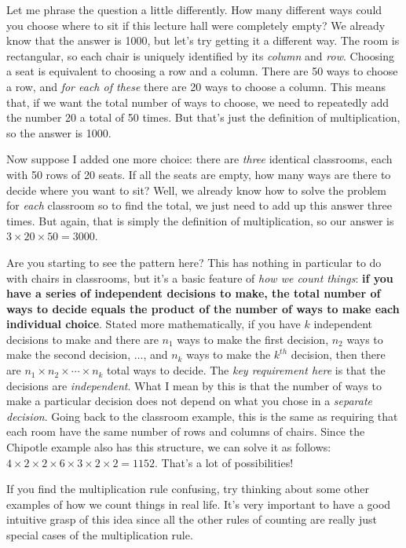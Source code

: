 \documentclass[12pt]{article}
\begin{document}
Let me phrase the question a little differently. How many different ways could you choose where to sit if this lecture hall were completely empty? We already know that the answer is 1000, but let's try getting it a different way. The room is rectangular, so each chair is uniquely identified by its \emph{column} and \emph{row}. Choosing a seat is equivalent to choosing a row and a column. There are 50 ways to choose a row, and \emph{for each of these} there are 20 ways to choose a column. This means that, if we want the total number of ways to choose, we need to repeatedly add the number 20 a total of 50 times. But that's just the definition of multiplication, so the answer is 1000.

Now suppose I added one more choice: there are \emph{three} identical classrooms, each with 50 rows of 20 seats. If all the seats are empty, how many ways are there to decide where you want to sit? Well, we already know how to solve the problem for \emph{each} classroom so to find the total, we just need to add up this answer three times. But again, that is simply the definition of multiplication, so our answer is $3 \times 20 \times 50 = 3000$.

Are you starting to see the pattern here? This has nothing in particular to do with chairs in classrooms, but it's a basic feature of \emph{how we count things}: \textbf{if you have a series of independent decisions to make, the total number of ways to decide equals the product of the number of ways to make each individual choice}. Stated more mathematically, if you have $k$ independent decisions to make and there are $n_1$ ways to make the first decision, $n_2$ ways to make the second decision, $\hdots$, and $n_k$ ways to make the $k^{th}$ decision, then there are $n_1 \times n_2 \times \cdots \times n_k$ total ways to decide. The \emph{key requirement here} is that the decisions are \emph{independent}.
What I mean by this is that the number of ways to make a particular decision does not depend on what you chose in a \emph{separate decision}.
Going back to the classroom example, this is the same as requiring that each room have the same number of rows and columns of chairs.
Since the Chipotle example also has this structure, we can solve it as follows: $4 \times 2 \times 2 \times 6 \times 3 \times 2 \times 2 = 1152$.
That's a lot of possibilities!

If you find the multiplication rule confusing, try thinking about some other examples of how we count things in real life.
It's very important to have a good intuitive grasp of this idea since all the other rules of counting are really just special cases of the multiplication rule.
\end{document}
